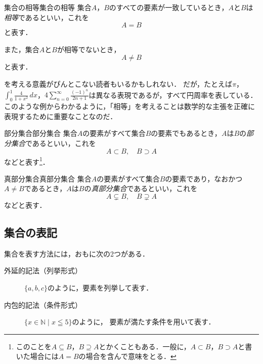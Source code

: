 \begin{definition}{集合の相等}{集合の相等}
  集合$A$，$B$のすべての要素が一致しているとき，$A$と$B$は\emph{相等}であるといい，これを
  \[
    A = B
  \]
  と表す．

  また，集合$A$と$B$が相等でないとき，
  \[
    A \ne B
  \]
  と表す．
\end{definition}

\begin{remark}[相等を考える意義]
  を考える意義がぴんとこない読者もいるかもしれない．
  だが，たとえば$\pi$，$\int_{0}^{1} \frac{4}{1+x^2} \, dx$，$4 \sum_{n=0}^{\infty} \frac{(-1)^n}{2n+1}$は異なる表現であるが，すべて円周率を表している．
  このような例からわかるように，「相等」を考えることは数学的な主張を正確に表現するために重要なことなのだ．
\end{remark}

\begin{definition}{部分集合}{部分集合}
  集合$A$の要素がすべて集合$B$の要素でもあるとき，$A$は$B$の\emph{部分集合}であるといい，これを
  \[
    A \subset B,\quad B \supset A
  \]
  などと表す\footnote{このことを$ A \subseteq B$，$B \supseteq A$とかくこともある．一般に，$A \subset B$，$ B \supset A$と書いた場合には$A=B$の場合を含んで意味をとる．}．
\end{definition}

\begin{definition}{真部分集合}{真部分集合}
  集合$A$の要素がすべて集合$B$の要素であり，なおかつ$A \ne B$であるとき，$A$は$B$の\emph{真部分集合}であるといい，これを
  \[
    A \subsetneq B,\quad B \supsetneq A
  \]
  などと表す．
\end{definition}

\subsection{集合の表記}

集合を表す方法には，おもに次の2つがある．

\begin{description}
  \item[外延的記法（列挙形式）]
        $\{a,b,c\}$のように，要素を列挙して表す．
  \item[内包的記法（条件形式）]
        $\{x\in\mathbb{N}\mid x\leqq5\}$のように，
        要素が満たす条件を用いて表す．
\end{description}

